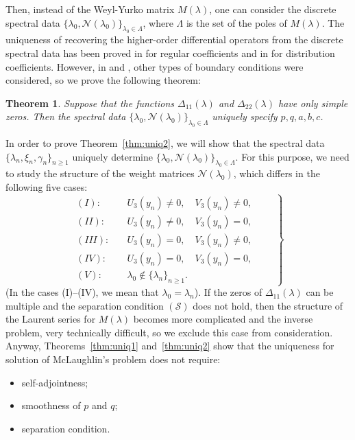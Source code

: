 \documentclass[a4paper,12pt]{article}
\newcommand{\ga}{\gamma}
\newcommand{\la}{\lambda}
\theoremstyle{plain}
\numberwithin{equation}{section}
\newtheorem{thm}{Theorem}[section]
\theoremstyle{definition}
\theoremstyle{remark}
\begin{document}
Then, instead of the Weyl-Yurko matrix $M(\la)$, one can consider the discrete spectral data $\{ \la_0, \mathcal N(\la_0) \}_{\la_0 \in \Lambda}$, where $\Lambda$ is the set of the poles of $M(\la)$. The uniqueness of recovering the higher-order differential operators from the discrete spectral data has been proved in \cite{Yur02} for regular coefficients and in \cite{Bond23-reg} for distribution coefficients. However, in \cite{Yur02} and \cite{Bond23-reg}, other types of boundary conditions were considered, so we prove the following theorem:

\begin{thm} \label{thm:sd}
Suppose that the functions $\Delta_{11}(\la)$ and $\Delta_{22}(\la)$ have only simple zeros. Then the spectral data $\{ \la_0, \mathcal N(\la_0) \}_{\la_0 \in \Lambda}$ uniquely specify $p,q,a,b,c$.
\end{thm}

In order to prove Theorem~\ref{thm:uniq2}, we will show that the spectral data $\{ \la_n, \xi_n, \ga_n \}_{n \ge 1}$ uniquely determine $\{ \la_0, \mathcal N(\la_0) \}_{\la_0 \in \Lambda}$. For this purpose, we need to study the structure of the weight matrices $\mathcal N(\la_0)$, which differs in the following five cases:
\begin{equation} \label{cases}
\left.\begin{array}{rl}
    (I) \colon & \quad U_3(y_n) \ne 0, \quad V_3(y_n) \ne 0, \\
    (II) \colon & \quad U_3(y_n) \ne 0, \quad V_3(y_n) = 0, \\
    (III) \colon & \quad U_3(y_n) = 0, \quad V_3(y_n) \ne 0, \\
    (IV) \colon & \quad U_3(y_n) = 0, \quad V_3(y_n) = 0, \\
    (V) \colon & \quad \la_0 \not\in \{ \la_n \}_{n \ge 1}.
\end{array} \qquad \right\}
\end{equation}
(In the cases (I)--(IV), we mean that $\la_0 = \la_n$). If the zeros of $\Delta_{11}(\la)$ can be multiple and the separation condition $(\mathcal S)$ does not hold, then the structure of the Laurent series for $M(\la)$ becomes more complicated and the inverse problem, very technically difficult, so we exclude this case from consideration. Anyway, Theorems~\ref{thm:uniq1} and~\ref{thm:uniq2} show that the uniqueness for solution of McLaughlin's problem does not require:
\begin{itemize}
\item self-adjointness;
\item smoothness of $p$ and $q$;
\item separation condition.
\end{itemize}
\end{document}
